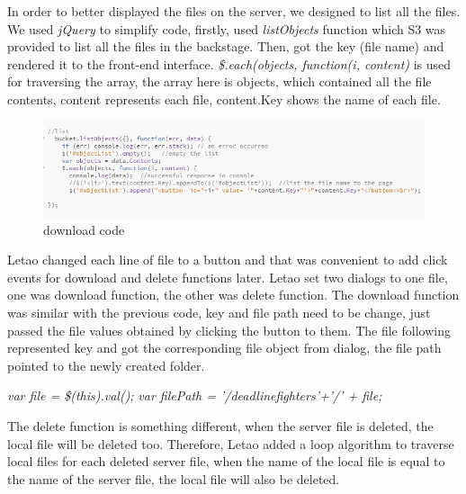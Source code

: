 \documentclass[a4paper]{article}
\begin{document}
\begin{flushleft}
In order to better displayed the files on the server, we designed to list all the files. We used \emph{jQuery} to simplify code, firstly, used \emph{listObjects} function which S3 was provided to list all the files in the backstage. Then, got the key (file name) and rendered it to the front-end interface. \emph{\$.each(objects, function(i, content)} is used for traversing the array, the array here is objects, which contained all the file contents, content represents each file, content.Key shows the name of each file.\newline

\begin{figure}[h!]
\centering
\includegraphics[scale=1.2]{code2}
\caption{download code}
\label{fig:code2}
\end{figure}

Letao changed each line of file to a button and that was convenient to add click events for download and delete functions later.\newline
Letao set two dialogs to one file, one was download function, the other was delete function. The download function was similar with the previous code, key and file path need to be change, just passed the file values obtained by clicking the button to them. The file following represented key and got the corresponding file object from dialog, the file path pointed to the newly created folder.\newline

\begin{center}
\emph{var file = \$(this).val();}\newline
\emph{var filePath = '/deadlinefighters'+'/' + file;}
\end{center}

The delete function is something different, when the server file is deleted, the local file will be deleted too. Therefore, Letao added a loop algorithm to traverse local files for each deleted server file, when the name of the local file is equal to the name of the server file, the local file will also be deleted.


\end{flushleft}
\end{document}
